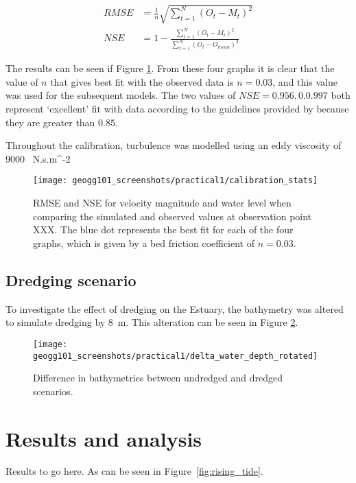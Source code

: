 \documentclass{article}
\begin{document}
\begin{align*}
    RMSE &= \frac{1}{n} \sqrt{ \sum_{t = 1}^N ( O_t - M_t) ^ 2 }\\
    NSE  &= 1 - \frac{\sum_{t = 1}^N ( O_t - M_t) ^ 2 }{\sum_{t = 1}^N ( O_t - O_{mean}) ^ 2 }
\end{align*}

The results can be seen if Figure \ref{fig:calibration_stats}. From these four graphs it is clear that the value of $n$ that gives best fit with the observed data is $n = 0.03$, and this value was used for the subsequent models. The two values of $NSE = 0.956, 0.0.997$ both represent `excellent' fit with data according to the guidelines provided by \textcite{henriksen2008assessment} because they are greater than $0.85$. 

Throughout the calibration, turbulence was modelled using an eddy viscosity of \SI{9000}{ N.s.m^{-2} }

\begin{figure}[hbp]
    \centering
    \texttt{[image: geogg101\_screenshots/practical1/calibration\_stats]}
    \caption{RMSE and NSE for velocity magnitude and water level when comparing the simulated and observed values at observation point XXX. The blue dot represents the best fit for each of the four graphs, which is given by a bed friction coefficient of $n = 0.03$.}
    \label{fig:calibration_stats}
\end{figure}



\subsection{Dredging scenario}

To investigate the effect of dredging on the Estuary, the bathymetry was altered to simulate dredging by \SI{8}{m}. This alteration can be seen in Figure \ref{fig:delta_depth}.

\begin{figure}[hbp]
    \centering
    \texttt{[image: geogg101\_screenshots/practical1/delta\_water\_depth\_rotated]}
    \caption{Difference in bathymetries between undredged and dredged scenarios.}
    \label{fig:delta_depth}
\end{figure}

\section{Results and analysis}
Results to go here. As can be seen in Figure~\ref{fig:rising_tide}.
\end{document}
